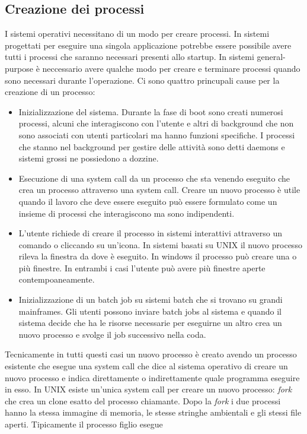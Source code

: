 \subsection{Creazione dei processi}
I sistemi operativi necessitano di un modo per creare processi. In sistemi progettati per eseguire una singola applicazione potrebbe essere possibile avere tutti i processi che saranno
necessari presenti allo startup. In sistemi general-purpose \`e neccessario avere qualche modo per creare e terminare processi quando sono necessari durante l'operazione. Ci sono 
quattro princupali cause per la creazione di un processo:
\begin{itemize}
	\item Inizializzazione del sistema. Durante la fase di boot sono creati numerosi processi, alcuni che interagiscono con l'utente e altri di background che non sono associati con
		utenti particolari ma hanno funzioni specifiche. I processi che stanno nel background per gestire delle attivit\`a sono detti daemons e sistemi grossi ne possiedono a 
		dozzine. 
	\item Esecuzione di una system call da un processo che sta venendo eseguito che crea un processo attraverso una system call. Creare un nuovo processo \`e utile quando il lavoro
		che deve essere eseguito pu\`o essere formulato come un insieme di processi che interagiscono ma sono indipendenti. 
	\item L'utente richiede di creare il processo in sistemi interattivi attraverso un comando o cliccando su un'icona. In sistemi basati su UNIX il nuovo processo rileva la finestra
		da dove \`e eseguito. In windows il processo pu\`o creare una o pi\`u finestre. In entrambi i casi l'utente pu\`o avere pi\`u finestre aperte contempoaneamente.
	\item Inizializzazione di un batch job su sistemi batch che si trovano su grandi mainframes. Gli utenti possono inviare batch jobs al sistema e quando il sistema decide che ha
		le risorse necessarie per eseguirne un altro crea un nuovo processo e svolge il job successivo nella coda.
\end{itemize}
Tecnicamente in tutti questi casi un nuovo processo \`e creato avendo un processo esistente che esegue una system call che dice al sistema operativo di creare un nuovo processo e indica
direttamente o indirettamente quale programma eseguire in esso. In UNIX esiste un'unica system call per creare un nuovo processo: \emph{fork} che crea un clone esatto del processo
chiamante. Dopo la \emph{fork} i due processi hanno la stessa immagine di memoria, le stesse stringhe ambientali e gli stessi file aperti. Tipicamente il processo figlio esegue
